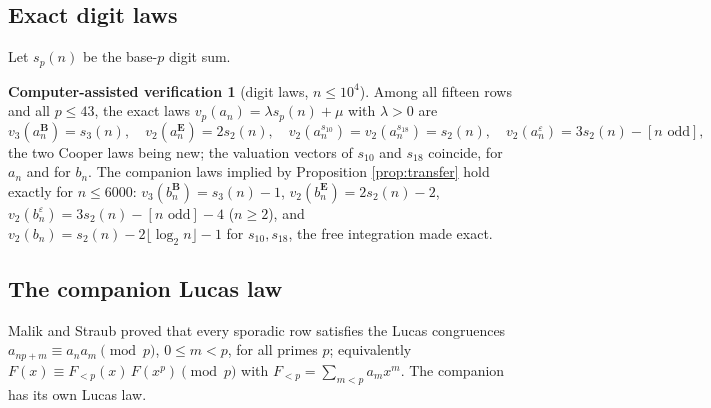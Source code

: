 \documentclass[11pt]{amsart}
\theoremstyle{definition}
\newtheorem{verification}[theorem]{Computer-assisted verification}
\theoremstyle{remark}
\begin{document}
\subsection{Exact digit laws}
Let $s_p(n)$ be the base-$p$ digit sum.
\begin{verification}[digit laws, $n\le10^4$]\label{ver:digit}
Among all fifteen rows and all $p\le43$, the exact laws $v_p(a_n)=\lambda s_p(n)+\mu$ with $\lambda>0$ are
$$v_3(a^{\mathbf B}_n)=s_3(n),\quad v_2(a^{\mathbf E}_n)=2s_2(n),\quad v_2(a^{s_{10}}_n)=v_2(a^{s_{18}}_n)=s_2(n),\quad v_2(a^{\varepsilon}_n)=3s_2(n)-[n\text{ odd}],$$
the two Cooper laws being new; the valuation vectors of $s_{10}$ and $s_{18}$ coincide, for $a_n$ and for $b_n$. The companion laws implied by Proposition \ref{prop:transfer} hold exactly for $n\le6000$: $v_3(b^{\mathbf B}_n)=s_3(n)-1$, $v_2(b^{\mathbf E}_n)=2s_2(n)-2$, $v_2(b^\varepsilon_n)=3s_2(n)-[n\text{ odd}]-4$ ($n\ge2$), and $v_2(b_n)=s_2(n)-2\lfloor\log_2n\rfloor-1$ for $s_{10},s_{18}$, the free integration made exact.
\end{verification}

\subsection{The companion Lucas law}
Malik and Straub \cite{MalikStraub} proved that every sporadic row satisfies the Lucas congruences $a_{np+m}\equiv a_na_m\pmod p$, $0\le m<p$, for all primes $p$; equivalently $F(x)\equiv F_{<p}(x)\,F(x^p)\pmod p$ with $F_{<p}=\sum_{m<p}a_mx^m$. The companion has its own Lucas law.
\end{document}

